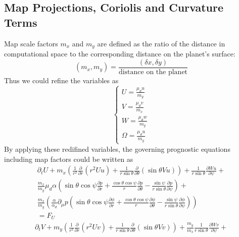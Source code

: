 \documentclass{article}
\begin{document}
\begin{sloppypar}
\subsection{Map Projections, Coriolis and Curvature Terms}
Map scale factors $m_x$ and $m_y$ are defined as the ratio of the distance in computational space to the corresponding distance on the planet's surface:
\begin{equation}
    (m_x,m_y)=\frac{(\delta{x}, \delta{y})}{\text{distance on the planet}}
\end{equation}
Thus we could refine the variables as
\begin{equation}
    \begin{cases}
        U=\frac{\mu_d{u}}{m_y}\\
        V=\frac{\mu_d{v}}{m_x}\\
        W=\frac{\mu_d{w}}{m_y}\\
        \Omega=\frac{\mu_d{u}}{m_y}
    \end{cases}
\end{equation}
By applying these redifined variables, the governing prognostic equations including map factors could be written as\newline
\begin{equation}
    \begin{split}
    \partial_t{U}+
    m_x(\frac{1}{r^2}\frac{\partial}{\partial{r}}(r^2Uu)+\frac{1}{r\sin\theta}\frac{\partial}{\partial\theta}(\sin\theta{Vu}))+\frac{1}{r\sin\theta}\frac{\partial{Wu}}{\partial{\psi}}+ \\
    \frac{m_x}{m_y}{\mu_d}\alpha(\sin\theta\cos\psi\frac{\partial{p}}{\partial{r}}+\frac{\cos\theta\cos\psi}{r}\frac{\partial{p}}{\partial{\theta}}-\frac{\sin\psi}{r\sin\theta}\frac{\partial{p}}{\partial{\psi}})+ \\
    \frac{m_x}{m_y}(\frac{\alpha}{\alpha_d}\partial_{\mu}p(\sin\theta\cos\psi\frac{\partial{\phi}}{\partial{r}}+\frac{\cos\theta\cos\psi}{r}\frac{\partial{\phi}}{\partial{\theta}}-\frac{\sin\psi}{r\sin\theta}\frac{\partial{\phi}}{\partial{\psi}})) \\
    =F_{U}
    \end{split}
\end{equation}
\begin{equation}
    \begin{split}
    \partial_t{V}+
    m_y(\frac{1}{r^2}\frac{\partial}{\partial{r}}(r^2Uv)+\frac{1}{r\sin\theta}\frac{\partial}{\partial\theta}(\sin\theta{Vv}))+\frac{m_y}{m_x}\frac{1}{r\sin\theta}\frac{\partial{Wv}}{\partial{\psi}}+ \\

\end{split}
\end{equation}
\end{sloppypar}
\end{document}

